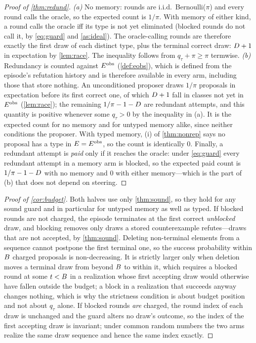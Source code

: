 \begin{proof}[Proof of \cref{thm:redund}]
\emph{(a)} No memory: rounds are i.i.d.\ Bernoulli($\pi$) and every round calls
the oracle, so the expected count is $1/\pi$. With memory of either kind, a
round calls the oracle iff its type is not yet eliminated (blocked rounds do
not call it, by \cref{eq:guard} and \cref{as:ideal}). The oracle-calling rounds
are therefore exactly the first draw of each distinct type, plus the terminal
correct draw: $D + 1$ in expectation by \cref{lem:race}. The inequality
follows from $q_\tau + \pi \ge \pi$ termwise.
\emph{(b)} Redundancy is counted against $E^{\mathrm{obs}}$ (\cref{def:eobs}), which is
defined from the episode's refutation history and is therefore available in
every arm, including those that store nothing. An unconditioned proposer draws
$1/\pi$ proposals in expectation before its first correct one, of which
$D + 1$ fall in classes not yet in $E^{\mathrm{obs}}$ (\cref{lem:race}); the
remaining $1/\pi - 1 - D$ are redundant attempts, and this quantity is
positive whenever some $q_\tau > 0$ by the inequality in (a). It is the
expected count for no memory and for untyped memory alike, since neither
conditions the proposer. With typed memory, (i) of \cref{thm:nonrep} says no
proposal has a type in $E = E^{\mathrm{obs}}$, so the count is identically $0$.
Finally, a redundant attempt is \emph{paid} only if it reaches the oracle:
under \cref{eq:guard} every redundant attempt in a memory arm is blocked, so
the expected paid count is $1/\pi - 1 - D$ with no memory and $0$ with
either memory---which is the part of (b) that does not depend on steering.
\end{proof}

\begin{proof}[Proof of \cref{cor:budget}]
Both halves use only \cref{thm:sound}, so they hold for any sound guard and in
particular for untyped memory as well as typed. If blocked rounds are not
charged, the episode terminates at the first correct \emph{unblocked} draw, and
blocking removes only draws a stored counterexample refutes---draws that are
not accepted, by \cref{thm:sound}. Deleting non-terminal elements from a
sequence cannot postpone the first terminal one, so the success probability
within $B$ charged proposals is non-decreasing. It is strictly larger
only when deletion moves a terminal draw from beyond $B$ to within it,
which requires a blocked round at some $t < B$ in a realization whose
first accepting draw would otherwise have fallen outside the budget; a block in
a realization that succeeds anyway changes nothing, which is why the strictness
condition is about budget position and not about $q_\tau$ alone. If blocked
rounds \emph{are} charged, the round index of each draw is unchanged and the
guard alters no draw's outcome, so the index of the first accepting draw is
invariant; under common random numbers the two arms realize the same draw
sequence and hence the same index exactly.
\end{proof}

